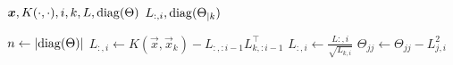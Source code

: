 \begin{algorithmic}[1]
  \REQUIRE \( \bm{x}, K(\cdot, \cdot), i, k, L, \operatorname{diag}(\Theta) \)
  \ENSURE \( L_{:, i}, \operatorname{diag}(\Theta_{\mid k}) \)

  \STATE \( n \gets \lvert \operatorname{diag}(\Theta) \rvert \)
  \STATE \(
    L_{:, i} \gets
    K(\vec{x}, \vec{x}_k) - L_{:, :i - 1} L_{k, :i - 1}^{\top}
  \)
  \STATE \( L_{:, i} \gets \frac{L{:, i}}{\sqrt{L_{k, i}}} \)
    \STATE \( \Theta_{jj} \gets \Theta_{jj} - L_{j, i}^2 \)
  \ENDFOR
\end{algorithmic}
